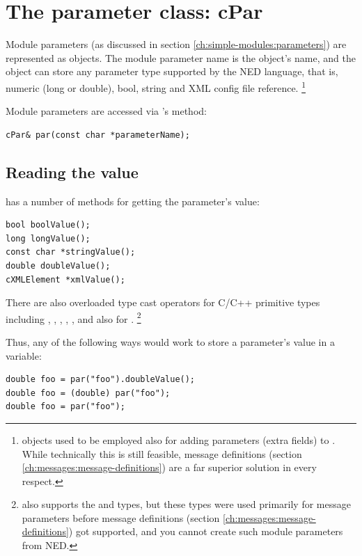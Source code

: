 \section{The parameter class: cPar}
\label{sec:ch-sim-lib:cpar}

Module parameters (as discussed in section \ref{ch:simple-modules:parameters})
are represented as  objects.
The module parameter name is the  object's name, and the object
can store any parameter type supported by the NED language, that is,
numeric (long or double), bool, string and XML config file reference.
    \footnote{ objects used to be employed also for adding
    parameters (extra fields) to . While technically this is
    still feasible, message definitions (section \ref{ch:messages:message-definitions})
    are a far superior solution in every respect.}

Module parameters are accessed via 's  method:

\begin{verbatim}
cPar& par(const char *parameterName);
\end{verbatim}

\subsection{Reading the value}

 has a number of methods for getting the parameter's value:

\begin{verbatim}
bool boolValue();
long longValue();
const char *stringValue();
double doubleValue();
cXMLElement *xmlValue();
\end{verbatim}

There are also overloaded type cast operators for C/C++ primitive types
including , , , , ,
and also for .
    \footnote{ also supports the  and  types,
    but these types were used primarily for message parameters before
    message definitions (section \ref{ch:messages:message-definitions})
    got supported, and you cannot create such module parameters from NED.}

Thus, any of the following ways would work to store a parameter's value in
a variable:

\begin{verbatim}
double foo = par("foo").doubleValue();
double foo = (double) par("foo");
double foo = par("foo");
\end{verbatim}

